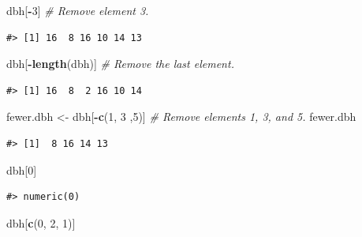 \documentclass[
  11pt,
]{krantz}
\newenvironment{Shaded}{\begin{snugshade}}{\end{snugshade}}
\newcommand{\CommentTok}[1]{\textcolor[rgb]{0.56,0.35,0.01}{\textit{#1}}}
\newcommand{\DecValTok}[1]{\textcolor[rgb]{0.00,0.00,0.81}{#1}}
\newcommand{\KeywordTok}[1]{\textcolor[rgb]{0.13,0.29,0.53}{\textbf{#1}}}
\newcommand{\NormalTok}[1]{#1}
\newcommand{\OperatorTok}[1]{\textcolor[rgb]{0.81,0.36,0.00}{\textbf{#1}}}
\newcommand{\StringTok}[1]{\textcolor[rgb]{0.31,0.60,0.02}{#1}}
\theoremstyle{definition}
\theoremstyle{definition}
\theoremstyle{definition}
\theoremstyle{definition}
\theoremstyle{remark}
\begin{document}
\begin{Shaded}
\begin{Highlighting}[]
\NormalTok{dbh[}\OperatorTok{{-}}\DecValTok{3}\NormalTok{] }\CommentTok{\# Remove element 3.}
\end{Highlighting}
\end{Shaded}

\begin{verbatim}
#> [1] 16  8 16 10 14 13
\end{verbatim}

\begin{Shaded}
\begin{Highlighting}[]
\NormalTok{dbh[}\OperatorTok{{-}}\KeywordTok{length}\NormalTok{(dbh)] }\CommentTok{\# Remove the last element.}
\end{Highlighting}
\end{Shaded}

\begin{verbatim}
#> [1] 16  8  2 16 10 14
\end{verbatim}

\begin{Shaded}
\begin{Highlighting}[]
\NormalTok{fewer.dbh \textless{}{-}}\StringTok{ }\NormalTok{dbh[}\OperatorTok{{-}}\KeywordTok{c}\NormalTok{(}\DecValTok{1}\NormalTok{, }\DecValTok{3}\NormalTok{ ,}\DecValTok{5}\NormalTok{)] }\CommentTok{\# Remove elements 1, 3, and 5.}
\NormalTok{fewer.dbh}
\end{Highlighting}
\end{Shaded}

\begin{verbatim}
#> [1]  8 16 14 13
\end{verbatim}

\begin{Shaded}
\begin{Highlighting}[]
\NormalTok{dbh[}\DecValTok{0}\NormalTok{]}
\end{Highlighting}
\end{Shaded}

\begin{verbatim}
#> numeric(0)
\end{verbatim}

\begin{Shaded}
\begin{Highlighting}[]
\NormalTok{dbh[}\KeywordTok{c}\NormalTok{(}\DecValTok{0}\NormalTok{, }\DecValTok{2}\NormalTok{, }\DecValTok{1}\NormalTok{)]}
\end{Highlighting}
\end{Shaded}
\end{document}
